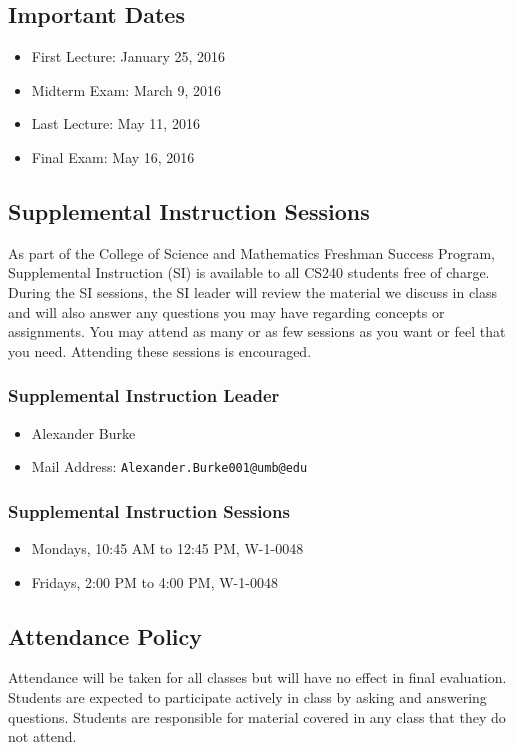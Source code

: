 \documentclass[12pt,letterpaper,twoside]{article}
\begin{document}
\subsection*{Important Dates}
\begin{itemize}
\item[] First Lecture: January 25, 2016
\item[] Midterm Exam: March 9, 2016
\item[] Last Lecture: May 11, 2016
\item[] Final Exam: May 16, 2016
\end{itemize}

\subsection*{Supplemental Instruction Sessions}
As part of the College of Science and Mathematics Freshman Success Program, Supplemental Instruction (SI) is available to all CS240 students free of charge.
During the SI sessions, the SI leader will review the material we discuss in class and will also answer any questions you may have regarding concepts or assignments.
You may attend as many or as few sessions as you want or feel that you need. Attending these sessions is encouraged.

\subsubsection*{Supplemental Instruction Leader}
\begin{itemize}
\item[] Alexander Burke
\item[] Mail Address: \texttt{Alexander.Burke001@umb@edu}
\end{itemize}

\subsubsection*{Supplemental Instruction Sessions}
\begin{itemize}
\item[] Mondays, 10:45 AM to 12:45 PM, W-1-0048
\item[] Fridays, 2:00 PM to 4:00 PM, W-1-0048
\end{itemize}

\subsection*{Attendance Policy}
Attendance will be taken for all classes but will have no effect in final evaluation.
Students are expected to participate actively in class by asking and answering questions.
Students are responsible for material covered in any class that they do not attend.
\end{document}
